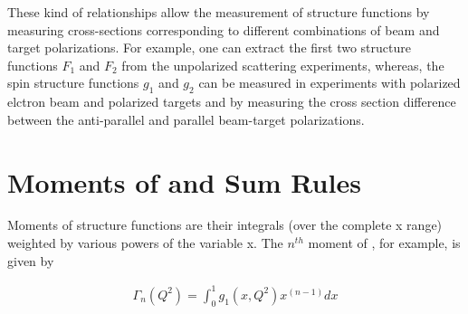 These kind of relationships allow the measurement of structure functions by measuring cross-sections corresponding to different combinations of %
beam and target polarizations. For example, one can extract the first two structure functions $F_1$ and $F_2$ from the unpolarized scattering experiments, %
whereas, the spin structure functions $g_1$ and $g_2$ can be measured in experiments with polarized elctron beam and polarized targets
and by measuring the cross section difference between the anti-parallel and parallel beam-target polarizations.



\section{Moments  of \gones and Sum Rules}
\label{integrals}
Moments of structure functions are their integrals (over the complete x range) weighted by various powers of the variable x. The $n^{th}$ moment of \gones, for example, is given by 

\begin{eqnarray}
\label{GammaN}
\Gamma_n(Q^2)  = \int^{1}_0  g_1(x,Q^2) x^{(n-1)}  dx
\end{eqnarray}

